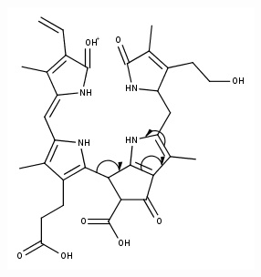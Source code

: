 \begin{figure}[!htbp]
  \begin{subfigure}[b]{0.5\textwidth}
    \includegraphics[width=\textwidth]{figures/Kapitel7/Kataboliten/fragmentation_structures/VWA_Katabolit_617_MH_RingD-RingC_331_electronMovement.png}
    \caption{}
    \label{fig:NCC2725}
  \end{subfigure}
  \hfill
  \begin{subfigure}[b]{0.5\textwidth}

\end{subfigure}
\end{figure}
